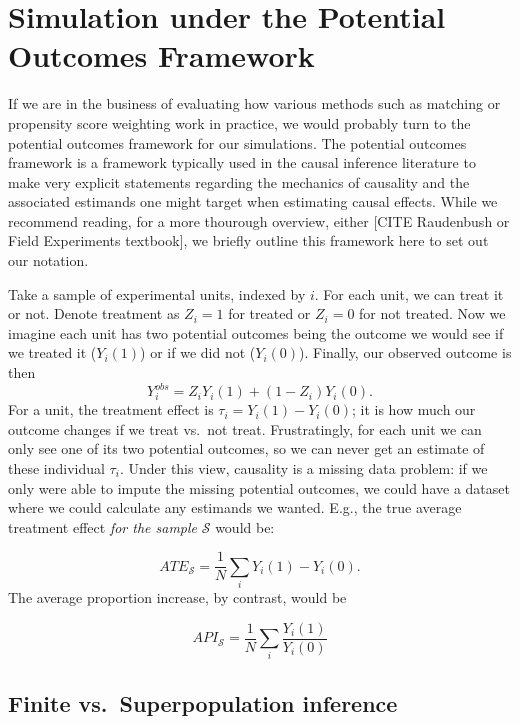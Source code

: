 \documentclass[
]{book}
\begin{document}
\hypertarget{simulation-under-the-potential-outcomes-framework}{%
\chapter{Simulation under the Potential Outcomes Framework}\label{simulation-under-the-potential-outcomes-framework}}

If we are in the business of evaluating how various methods such as matching or propensity score weighting work in practice, we would probably turn to the potential outcomes framework for our simulations.
The potential outcomes framework is a framework typically used in the causal inference literature to make very explicit statements regarding the mechanics of causality and the associated estimands one might target when estimating causal effects.
While we recommend reading, for a more thourough overview, either {[}CITE Raudenbush or Field Experiments textbook{]}, we briefly outline this framework here to set out our notation.

Take a sample of experimental units, indexed by \(i\).
For each unit, we can treat it or not.
Denote treatment as \(Z_i = 1\) for treated or \(Z_i = 0\) for not treated.
Now we imagine each unit has two potential outcomes being the outcome we would see if we treated it (\(Y_i(1)\)) or if we did not (\(Y_i(0)\)).
Finally, our observed outcome is then
\[ Y_i^{obs} = Z_i Y_i(1) + (1-Z_i)Y_i(0) .\]
For a unit, the treatment effect is \(\tau_i = Y_i(1) - Y_i(0)\); it is how much our outcome changes if we treat vs.~not treat.
Frustratingly, for each unit we can only see one of its two potential outcomes, so we can never get an estimate of these individual \(\tau_i\).
Under this view, causality is a missing data problem: if we only were able to impute the missing potential outcomes, we could have a dataset where we could calculate any estimands we wanted. E.g., the true average treatment effect \emph{for the sample} \(\mathcal{S}\) would be:

\[ ATE_{\mathcal{S}} = \frac{1}{N} \sum_{i} Y_i(1) - Y_i( 0 ) . \]
The average proportion increase, by contrast, would be

\[ API_{\mathcal{S}} = \frac{1}{N} \sum_{i} \frac{Y_i(1)}{Y_i(0)} \]

\hypertarget{finite-vs.-superpopulation-inference}{%
\section{Finite vs.~Superpopulation inference}\label{finite-vs.-superpopulation-inference}}
\end{document}
